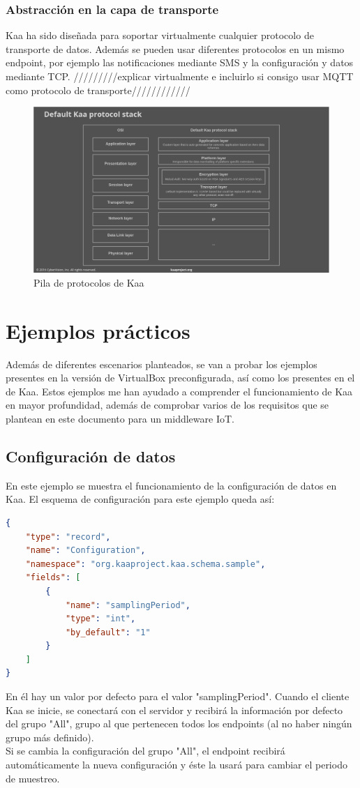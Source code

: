 \documentclass[12pt, twoside]{book}
\newcommand{\MYhref}[3][blue]{\href{#2}{\color{#1}{#3}}}
\begin{document}
\subsubsection*{Abstracción en la capa de transporte}
Kaa ha sido diseñada para soportar virtualmente cualquier protocolo de transporte de datos. Además se pueden usar diferentes protocolos en un mismo endpoint, por ejemplo las notificaciones mediante SMS y la configuración y datos mediante TCP. /////////explicar virtualmente e incluirlo si consigo usar MQTT como protocolo de transporte////////////
\begin{figure}[H]
\centering
\includegraphics[scale=0.3]{images/kaa_stack}
\caption{Pila de protocolos de Kaa}\label{L508}
\end{figure}


\section{Ejemplos prácticos}
Además de diferentes escenarios planteados, se van a probar los ejemplos  presentes en la versión de VirtualBox preconfigurada, así como los presentes en el \MYhref{https://github.com/kaaproject/sample-apps}{GIT} de Kaa. Estos ejemplos me han ayudado a comprender el funcionamiento de Kaa en mayor profundidad, además de comprobar varios de los requisitos que se plantean en este documento para un middleware IoT. 

\subsection{Configuración de datos}
En este ejemplo se muestra el funcionamiento de la configuración de datos en Kaa. El esquema de configuración para este ejemplo queda así:
\begin{lstlisting}[language=json]
{
	"type": "record",
	"name": "Configuration",
	"namespace": "org.kaaproject.kaa.schema.sample",
	"fields": [
		{
			"name": "samplingPeriod",
			"type": "int",
			"by_default": "1"
		}
	]
}
\end{lstlisting}
En él hay un valor por defecto para el valor "samplingPeriod". Cuando el cliente Kaa se inicie, se conectará con el servidor y recibirá la información por defecto del grupo "All", grupo al que pertenecen todos los endpoints (al no haber ningún grupo más definido).\\
Si se cambia la configuración del grupo "All", el endpoint recibirá automáticamente la nueva configuración y éste la usará para cambiar el periodo de muestreo.
\end{document}

